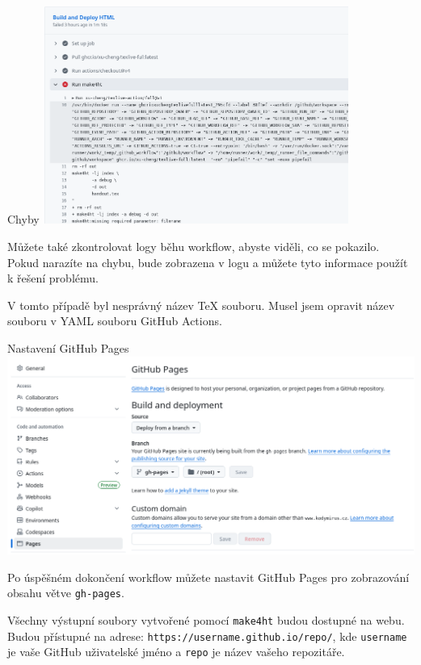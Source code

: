 \begin{frame}[fragile]{Chyby}
\includegraphics[width=0.75\textwidth]{img/github-error.png}
\end{frame}

Můžete také zkontrolovat logy běhu workflow, abyste viděli, co se pokazilo.
Pokud narazíte na chybu, bude zobrazena v logu a můžete tyto informace
použít k řešení problému.

V tomto případě byl nesprávný název TeX souboru. Musel jsem opravit název
souboru v YAML souboru GitHub Actions.


\begin{frame}[fragile]{Nastavení GitHub Pages}
\includegraphics[width=\textwidth]{img/github-pages.png}
\end{frame}

Po úspěšném dokončení workflow můžete nastavit GitHub Pages pro zobrazování obsahu větve \texttt{gh-pages}.

Všechny výstupní soubory vytvořené pomocí \texttt{make4ht} budou dostupné na webu.
Budou přístupné na adrese:
\verb|https://username.github.io/repo/|,
kde \texttt{username} je vaše GitHub uživatelské jméno a \texttt{repo} je název vašeho repozitáře.

